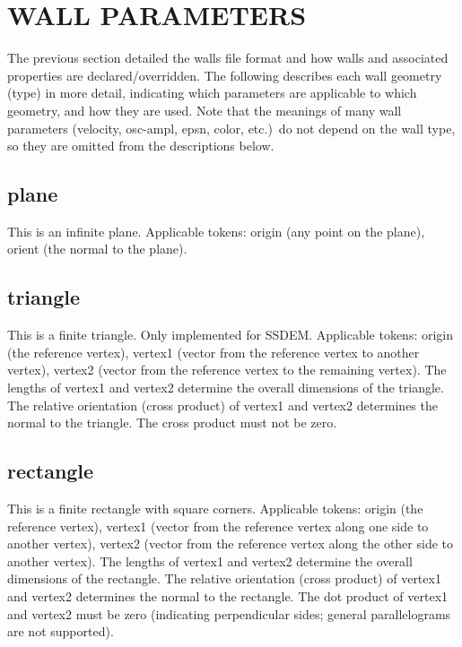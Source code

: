
\section{WALL PARAMETERS} \label{s:params}

The previous section detailed the walls file format and how walls and
associated properties are declared/overridden.  The following
describes each wall geometry (type) in more detail, indicating which
parameters are applicable to which geometry, and how they are used.
Note that the meanings of many wall parameters (\eg velocity,
osc-ampl, epsn, color, etc.)\ do not depend on the wall type, so they
are omitted from the descriptions below.

\subsection{plane}

This is an infinite plane.  Applicable tokens: origin (any point on
the plane), orient (the normal to the plane).

\subsection{triangle}

This is a finite triangle.  Only implemented for SSDEM.  Applicable
tokens: origin (the reference vertex), vertex1 (vector from the
reference vertex to another vertex), vertex2 (vector from the
reference vertex to the remaining vertex).  The lengths of vertex1 and
vertex2 determine the overall dimensions of the triangle.  The
relative orientation (cross product) of vertex1 and vertex2 determines
the normal to the triangle.  The cross product must not be zero.

\subsection{rectangle}

This is a finite rectangle with square corners.  Applicable tokens:
origin (the reference vertex), vertex1 (vector from the reference
vertex along one side to another vertex), vertex2 (vector from the
reference vertex along the other side to another vertex).  The lengths
of vertex1 and vertex2 determine the overall dimensions of the
rectangle.  The relative orientation (cross product) of vertex1 and
vertex2 determines the normal to the rectangle.  The dot product of
vertex1 and vertex2 must be zero (indicating perpendicular sides;
general parallelograms are not supported).

